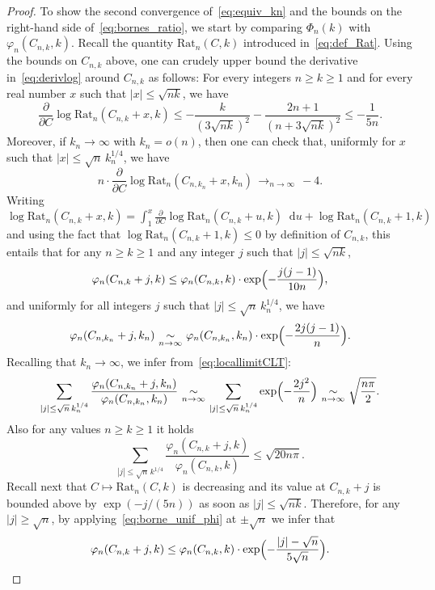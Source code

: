 \documentclass[JEP,XML,SOM,Unicode,NoFloatCountersInSection,NoEqCountersInSection]{cedram}
\theoremstyle{plain}
\theoremstyle{definition}
\theoremstyle{remark}
\renewcommand{\d}{\mathop{}\!\mathrm{d}}
\newcommand{\cv}[1][n]{\,\mathop{\longrightarrow}^{}_{#1 \to \infty}\,}
\newcommand{\equi}[1][n]{\,\mathop{\sim}^{}_{#1 \to \infty}\,}
\begin{document}
\begin{proof}
To show the second convergence of~\eqref{eq:equiv_kn} and the bounds on the right-hand side of~\eqref{eq:bornes_ratio}, we start by comparing $\Phi_n(k)$ with $\varphi_{n}(C_{n,k},k)$.
Recall the quantity $\mathrm{Rat}_{n}(C,k)$ introduced in~\eqref{eq:def_Rat}.
Using the bounds on $C_{n,k}$ above, one can crudely upper bound the derivative in~\eqref{eq:derivlog} around $C_{n,k}$ as follows: For every integers $n \ge k \ge 1$ and for every real number $x$ such that $|x| \le \sqrt{nk}$, we have
\[
\frac{\partial}{\partial C} \log \mathrm{Rat}_n(C_{n,k}+x,k)
\le - \frac{k}{(3\sqrt{nk})^2}- \frac{2n+1}{(n+3\sqrt{nk})^2}
\le - \frac{1}{5n}.
\]
Moreover, if $k_n \to\infty$ with $k_n = o(n)$, then
one can check that, uniformly for $x$ such that $|x| \leq \sqrt{n}\, k_{n}^{1/4}$, we have
\[
n \cdot \frac{\partial}{\partial C} \log \mathrm{Rat}_n(C_{n,k_{n}}+x,k_{n}) \cv -4.
\]
Writing $ \log \mathrm{Rat}_n(C_{n,k}+x,k) = \int_{1}^{x} \frac{\partial}{\partial C} \log \mathrm{Rat}_n(C_{n,k}+u,k) \d u+\log \mathrm{Rat}_n(C_{n,k}+1,k)$ and using the fact that $\log \mathrm{Rat}_n(C_{n,k}+1,k) \leq 0$ by definition of $C_{n,k}$,
this entails that for any $n \ge k \ge 1$ and any integer $j$ such that $|j| \le \sqrt{nk}$,
\begin{equation} \label{eq:borne_unif_phi}
\varphi_{n}(C_{n,k}+j,k) \le \varphi_{n}(C_{n,k},k) \cdot \exp\Bigl(- \frac{j(j-1)}{10n}\Bigr),
\end{equation}
and uniformly for all integers $j$ such that $|j| \leq \sqrt{n}\, k_{n}^{1/4}$, we have
\begin{equation}\label{eq:locallimitCLT}
\varphi_{n}(C_{n,k_{n}}+j,k_{n}) \equi \varphi_{n}(C_{n,k_{n}},k_{n}) \cdot \exp\Bigl(-\frac{2j(j-1)}{n}\Bigr).
\end{equation}
Recalling that $k_{n} \to \infty$, we infer from~\eqref{eq:locallimitCLT}:
\[
\sum_{|j| \leq \sqrt{n}\,k_{n}^{1/4}} \frac{\varphi_{n}(C_{n,k_{n}}+j,k_{n})}{\varphi_{n}(C_{n,k_{n}},k_{n})}
\equi \sum_{|j| \leq \sqrt{n}\,k_{n}^{1/4}} \exp\Bigl(- \frac{2j^2}{n}\Bigr)
\equi \sqrt{\frac{n \pi}{2}}.
\]
Also for any values $n \ge k \ge 1$ it holds
\[
\sum_{|j| \leq \sqrt{n}\,k^{1/4}} \frac{\varphi_{n}(C_{n,k}+j,k)}{\varphi_{n}(C_{n,k},k)}
\le \sqrt{20 n \pi}.
\]
Recall next that $ C \mapsto \mathrm{Rat}_n(C,k)$ is decreasing and its value at $C_{n,k}+j$ is bounded above by $\exp(-j/(5n))$ as soon as $|j| \le \sqrt{nk}$. Therefore, for any $|j| \ge\sqrt{n}$, by applying~\eqref{eq:borne_unif_phi} at $\pm\sqrt{n}$ we infer that
\[
\varphi_{n}(C_{n,k}+j,k) \le \varphi_{n}(C_{n,k},k) \cdot \exp\Bigl(- \frac{|j|-\sqrt{n}}{5\sqrt{n}}\Bigr).
\]
\end{proof}
\end{document}
